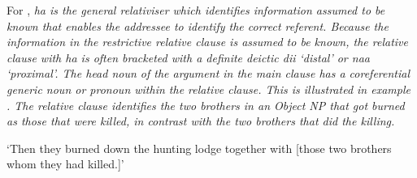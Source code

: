 
For ,
\it{ha} is the general relativiser which identifies information
assumed to be known that enables the addressee to identify the correct referent.
Because the information in the restrictive relative clause is
assumed to be known,
the relative clause with \it{ha} is often bracketed with a definite
deictic \it{dii} ‘distal’ or \it{naa} ‘proximal’.
The head noun of the argument in the main clause has a coreferential
generic noun or pronoun within the relative clause.
This is illustrated in example .
The relative clause identifies the two brothers in an Object
NP that got burned as those that were killed,
in contrast with the two brothers that did the killing.

\begin{exe}\setcounter{xnumi}{23}
			\glt	‘Then they burned down the hunting lodge together with [those two brothers whom they had killed.]’ 
						\label{ex:13-24}
\end{exe}

